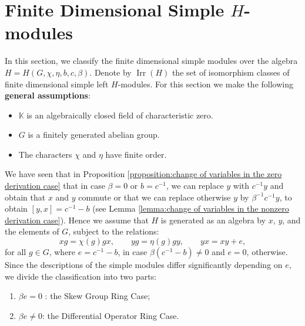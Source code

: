 \documentclass[11pt, twoside]{amsart}
\theoremstyle{definition}
\newcommand{\KK}{\mathbb{K}}
\newcommand{\Irr}{\operatorname{Irr}}
\begin{document}
\section{Finite Dimensional Simple $H$-modules}\label{section:finite dimensional simple $H$-modules}

In this section, we classify the finite dimensional simple modules over the algebra $H = H(G, \chi, \eta, b, c, \beta)$. Denote by $\Irr(H)$ the set of isomorphism classes of finite dimensional simple left $H$-modules. 
For this section we make the following {\bf general assumptions}:
\begin{itemize}
\item $\KK$ is an algebraically closed field of characteristic zero.
\item $G$ is a finitely generated abelian group.
\item The characters $\chi$ and $\eta$ have finite order.  
\end{itemize}

We have seen that in Proposition \ref{proposition:change of variables in the zero derivation case} that in case $\beta=0$ or $b=c^{-1}$, we can replace $y$ with $c^{-1}y$ and obtain that $x$ and $y$ commute 
or that we can replace otherwise $y$ by $\beta^{-1}c^{-1}y$, to obtain $[y,x]=c^{-1}-b$ (see Lemma \ref{lemma:change of variables in the nonzero derivation case}). Hence we assume that $H$ is generated as an algebra by $x$, $y$, and the elements of $G$, subject to the relations:
\[
    xg = \chi(g)gx, \qquad yg = \eta(g)gy, \qquad yx = xy + e,
\]
for all $g \in G$, where  $e=c^{-1}-b$, in case $\beta(c^{-1}-b)\neq 0$ and $e=0$, otherwise.
Since the descriptions of the simple modules differ significantly depending on $e$, we divide the classification into two parts:
\begin{enumerate}
    \item $\beta e =0$ : the Skew Group Ring Case;
    \item $\beta e \neq 0$: the Differential Operator Ring Case.
\end{enumerate}
\end{document}
